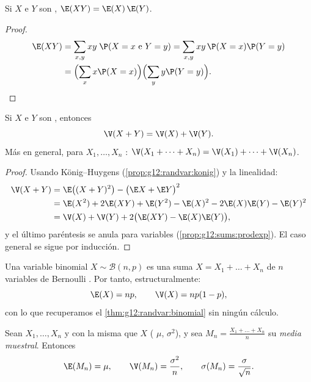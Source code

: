 \begin{proposition}\label{prop:g12:sums:prodexp}
Si $X$ e $Y$ son , $\E(XY) = \E(X)\,\E(Y)$.
\end{proposition}

\begin{proof}
\[
\begin{aligned}
\E(XY) &= \sum_{x, y} xy\;\P(X = x \text{ e } Y = y)
= \sum_{x, y} xy\,\P(X=x)\P(Y=y) \\
&= \Bigl(\sum_x x\P(X=x)\Bigr)\Bigl(\sum_y y\P(Y=y)\Bigr). \qedhere
\end{aligned}
\]
\end{proof}

\begin{theorem}\label{thm:g12:sums:variance}
Si $X$ e $Y$ son \emph{}, entonces
\[
\V(X + Y) = \V(X) + \V(Y).
\]
Más en general, para $X_1, \dots, X_n$ :
$\V(X_1 + \dots + X_n) = \V(X_1) + \dots + \V(X_n)$.
\end{theorem}

\begin{proof}
Usando König--Huygens (\cref{prop:g12:randvar:konig}) y la linealidad:
\begin{align*}
\V(X + Y) &= \E\bigl((X+Y)^2\bigr) - \bigl(\E X + \E Y\bigr)^2\\
&= \E(X^2) + 2\E(XY) + \E(Y^2)
- \E(X)^2 - 2\E(X)\E(Y) - \E(Y)^2\\
&= \V(X) + \V(Y) + 2\bigl(\E(XY) - \E(X)\E(Y)\bigr),
\end{align*}
y el último paréntesis se anula para variables 
(\cref{prop:g12:sums:prodexp}). El caso general se sigue por inducción.
\end{proof}

\begin{example}\label{ex:g12:sums:binomial}
Una variable binomial $X \sim \mathcal B(n, p)$ es una suma
$X = X_1 + \dots + X_n$ de $n$ variables de Bernoulli . Por
tanto, estructuralmente:
\[
\E(X) = np, \qquad \V(X) = np(1-p),
\]
con lo que recuperamos el \cref{thm:g12:randvar:binomial} sin ningún
cálculo.
\end{example}

\begin{proposition}\label{prop:g12:sums:mean}
Sean $X_1, \dots, X_n$  y con la misma  que $X$
( $\mu$,  $\sigma^2$), y sea
$M_n = \frac{X_1 + \dots + X_n}{n}$ su \emph{media muestral}. Entonces
\[
\E(M_n) = \mu, \qquad \V(M_n) = \frac{\sigma^2}{n}, \qquad
\sigma(M_n) = \frac{\sigma}{\sqrt n}.
\]
\end{proposition}

